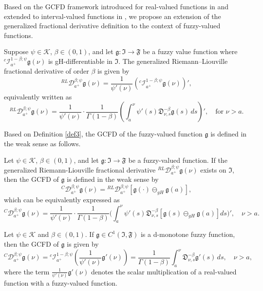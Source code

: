 \documentclass[reqno]{amsart}
\begin{document}
Based on the GCFD framework introduced for real-valued functions in \cite{alm,bal} 
and extended to interval-valued functions in \cite{Fan}, we propose an extension of the 
generalized fractional derivative definition to the context of fuzzy-valued functions.

\begin{definition}\label{def3} \rm
Suppose \(\psi \in \mathcal{K}\), \(\beta \in (0,1)\), and let 
\(\mathfrak{g} : \mathfrak{I} \to \mathfrak{F}\) be a fuzzy value function where 
\({}^{c}\mathcal{I}_{a^{+}}^{1-\beta ; \psi} \mathfrak{g}(\nu )\) is gH-differentiable 
in \(\mathfrak{I}\). The generalized Riemann--Liouville fractional derivative of order 
\(\beta\) is given by
\[
{}^{RL} \mathcal{D}_{a^{+}}^{\beta ; \psi} \mathfrak{g}(\nu ) 
= \frac{1}{\psi'(\nu )} ( {}^{c} \mathcal{I}_{a^{+}}^{1-\beta ; \psi} \mathfrak{g}(\nu ) )',
\]
equivalently written as
\[
{}^{RL} \mathcal{D}_{a^{+}}^{\beta ; \psi} \mathfrak{g}(\nu )
 = \frac{1}{\psi'(\nu )} \cdot \frac{1}{\Gamma(1 - \beta)} ( \int_{a}^{\nu } \psi'(s) \mathfrak{D}_{\nu ,s}^{-\beta} \mathfrak{g}(s) \, ds )', \quad \text{for } \nu > a. \tag{2.5}
\]
\end{definition}

Based on Definition \ref{def3}, the GCFD of the fuzzy-valued function $\mathfrak{g}$ 
is defined in the weak sense as follows.


\begin{definition}\label{def4} \rm
Let \(\psi \in \mathcal{K}\), \(\beta \in (0,1)\), and let 
\(\mathfrak{g} : \mathfrak{I} \to \mathfrak{F}\) be a fuzzy-valued function. If the 
generalized Riemann-Liouville fractional derivative 
\({}^{RL} \mathcal{D}_{a^{+}}^{\beta ; \psi} \mathfrak{g}(\nu )\) exists on 
\(\mathfrak{I}\), then the GCFD of \(\mathfrak{g}\) is defined in the weak sense by
$$
{}^C \mathcal{D}_{a^{+}}^{\beta ; \psi} \mathfrak{g}(\nu ) 
= {}^{RL} \mathcal{D}_{a^{+}}^{\beta ; \psi} [ \mathfrak{g}(\cdot) \ominus_{gH} 
\mathfrak{g}(a) ],
$$
which can be equivalently expressed as
\[
{}^C \mathcal{D}_{a^{+}}^{\beta ; \psi} \mathfrak{g}(\nu ) 
= \frac{1}{\psi'(\nu )} \cdot \frac{1}{\Gamma(1 - \beta)} 
\Big( \int_{a}^{\nu } \psi'(s) \mathfrak{D}_{\nu ,s}^{-\beta} [ \mathfrak{g}(s)
 \ominus_{gH} \mathfrak{g}(a) ] ds \Big)', \quad \nu > a. \tag{2.6}
\]
\end{definition}

\begin{theorem} \label{thm2.1}
Let \(\psi \in \mathcal{K}\) and \(\beta \in (0,1)\). 
If \(\mathfrak{g} \in C^1(\mathfrak{I}, \mathfrak{F})\) is a d-monotone fuzzy function, 
then the GCFD of \(\mathfrak{g}\) is given by
\begin{equation}
\label{e2.7}
{}^C \mathcal{D}_{a^{+}}^{\beta ; \psi} \mathfrak{g}(\nu )
= {}^{c} \mathcal{I}_{a^{+}}^{1-\beta ; \psi} ( \frac{1}{\psi'(\nu )}
\mathfrak{g}'(\nu ) ) = \frac{1}{\Gamma(1 - \beta)} \int_{a}^{\nu }
\mathfrak{D}_{\nu ,s}^{-\beta} \mathfrak{g}'(s) \, ds, \quad \nu > a,
\end{equation}
where the term \(\frac{1}{\psi'(\nu )} \mathfrak{g}'(\nu )\) denotes the scalar
multiplication of a real-valued function with a fuzzy-valued function.
\end{theorem}
\end{document}

